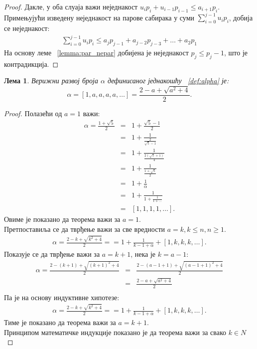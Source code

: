 \documentclass[a4paper]{article}
\newtheorem{lemma}{Лема}
\begin{document}
\begin{proof}
	Дакле, у оба слуаја важи неједнакост $ u_{i}p_{i}+u_{i-1}p_{i-1} \le a_{i+1}p_{i}$.\\
	Примењујући изведену неједнакост на парове сабирака у суми $ \sum_{i=0}^{j-1} u_{i}p_{i} $, добија се неједнакост:
	\begin{eqnarray*}
		\sum_{i=0}^{j-1} u_{i}p_{i} \leq a_{j}p_{j-1} + a_{j-2}p_{j-3} + \ldots + a_{2}p_{1}
	\end{eqnarray*}
	На основу леме ~\ref{lemma:par_nepar} добијена је неједнакост $ p_{j} \leq p_{j} - 1 $, што је контрадикција.
	
\end{proof}

\begin{lemma}
	Верижни развој броја $ \alpha $ дефинисаног једнакошћу ~\eqref{def:alpha} је:
	\begin{displaymath}
	\alpha = [1 ,a, a, a, a, \ldots] = \frac{2 - a + \sqrt{a^2 + 4}}{2}.
	\end{displaymath}  
\end{lemma}

\begin{proof}
	Полазећи од $ a = 1 $ важи:	
		\begin{eqnarray*}
			\alpha = \frac{1+\sqrt 5}{2} &=& 1 + \frac{\sqrt 5 - 1}{2}\\
										 &=& 1 + \frac{1}{\frac{2}{\sqrt 5 - 1}}\\
										 &=& 1 + \frac{1}{\frac{2(\sqrt 5 + 1)}{4}}\\
										 &=& 1 + \frac{1}{\frac{1 + \sqrt 5}{2}}\\
										 &=& 1 + \frac{1}{\alpha}\\
										 &=& 1 + \frac{1}{1 + \frac{1}{1 + \ldots}}\\
										 &=& [1, 1, 1, 1, \ldots].
		\end{eqnarray*}
	Овиме је показано да теорема важи за $ a = 1 $.\\
	Претпоставиља се да тврђење важи за све вредности $ a = k, k \leq n, n \geq 1 $. 	
		\begin{eqnarray*}
			\alpha = \frac{2 - k + \sqrt{k^2+4}}{2} = = 1 + \frac{1}{k-1+\alpha} + [1, k, k, k, \ldots].
		\end{eqnarray*}
	Показује се да тврђење важи за $ a = k + 1 $, нека је $ k = a - 1 $:	
		\begin{eqnarray*}
			\alpha = \frac{2 - (k + 1) + \sqrt{(k + 1)^2 + 4}}{2} &=& \frac{2 - (a - 1 + 1) + \sqrt{(a - 1 + 1)^2 + 4}}{2}\\
																  &=& \frac{2 - a + \sqrt{a^2 + 4}}{2}\\
		\end{eqnarray*}
	Па је на основу индуктивне хипотезе:
		\begin{eqnarray*}
			\alpha = \frac{2 - k + \sqrt{k^2+4}}{2} = = 1 + \frac{1}{k-1+\alpha} + [1, k, k, k, \ldots].
		\end{eqnarray*}
	Тиме је показано да теорема важи за $ a = k + 1 $. \\	
	Принципом математичке индукције показано је да теорема важи за свако $ k \in N $
\end{proof}
\end{document}
